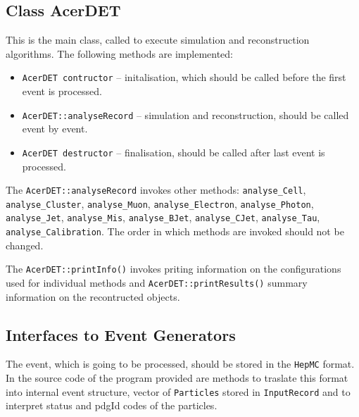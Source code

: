 \subsection{Class AcerDET}

This is the main class, called to execute simulation and
reconstruction algorithms. The following methods
are implemented:
\begin{itemize}
\item
{\tt AcerDET contructor} -- initalisation, which should be called before the first
event is processed.
\item
{\tt AcerDET::analyseRecord} -- simulation and reconstruction, should be called event
by event.
\item 
{\tt AcerDET destructor} -- finalisation, should be called after last event is
processed.
\end{itemize}

The {\tt AcerDET::analyseRecord} invokes other methods: {\tt  analyse\_Cell},
{\tt  analyse\_Cluster}, {\tt  analyse\_Muon}, {\tt  analyse\_Electron}, 
{\tt analyse\_Photon}, {\tt analyse\_Jet}, {\tt  analyse\_Mis}, {\tt  analyse\_BJet}, 
{\tt analyse\_CJet}, {\tt analyse\_Tau}, {\tt  analyse\_Calibration}.
The order in which methods are invoked should not be changed. 

The {\tt AcerDET::printInfo()} invokes priting information on the configurations used for 
individual methods and  {\tt AcerDET::printResults()} summary information on the recontructed
objects. 
    

\subsection{Interfaces to Event Generators}

The event, which is going to be processed, should be stored
in the {\tt HepMC} format. In the source code of the program
provided are methods to traslate this format into internal event
structure, vector of {\tt Particles} stored in {\tt InputRecord} 
and to interpret status and pdgId codes of the particles. 


